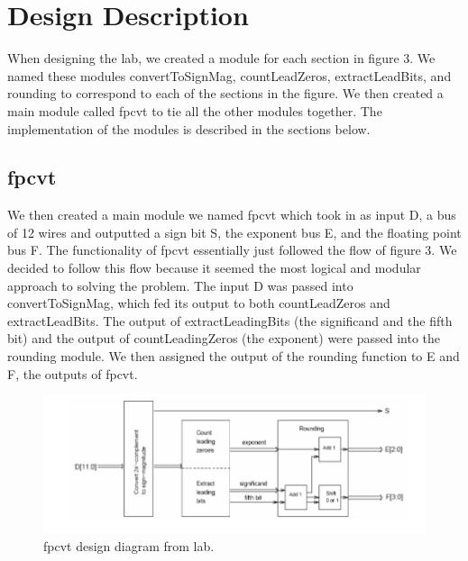 \documentclass{article}
\begin{document}
 

\section*{Design Description}


When designing the lab, we created a module for each section in figure 3. We named these modules convertToSignMag, countLeadZeros, extractLeadBits, and rounding to correspond to each of the sections in the figure. We then created a main module called fpcvt to tie all the other modules together. The implementation of the modules is described in the sections below.

\subsection*{fpcvt}
We then created a main module we named fpcvt which took in as input D, a bus of 12 wires and outputted a sign bit S, the exponent bus E, and the floating point bus F. The functionality of fpcvt essentially just followed the flow of figure 3. We decided to follow this flow because it seemed the most logical and modular approach to solving the problem. The input D was passed into convertToSignMag, which fed its output to both countLeadZeros and extractLeadBits. The output of extractLeadingBits (the significand and the fifth bit) and the output of countLeadingZeros (the exponent) were passed into the rounding module. We then assigned the output of the rounding function to E and F, the outputs of fpcvt.

\begin{figure}[H]
	\begin{center}
		\includegraphics[width=1\textwidth]{overall_design_ideas.png} 
		\caption{fpcvt design diagram from lab.}
	\end{center}
\end{figure}
\end{document}
